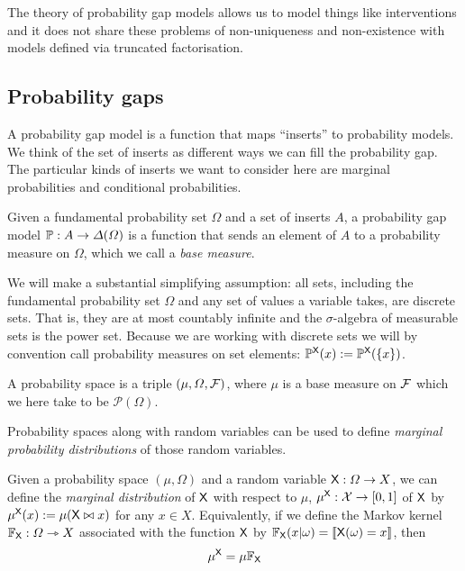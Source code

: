 The theory of probability gap models allows us to model things like interventions and it does not share these problems of non-uniqueness and non-existence with models defined via truncated factorisation.

\subsection{Probability gaps}

A probability gap model is a function that maps ``inserts'' to probability models. We think of the set of inserts as different ways we can fill the probability gap. The particular kinds of inserts we want to consider here are marginal probabilities and conditional probabilities.

\begin{definition}
Given a fundamental probability set $\Omega$ and a set of inserts $A$, a probability gap model $\mathbb{P}:A\to \Delta(\Omega)$ is a function that sends an element of $A$ to a probability measure on $\Omega$, which we call a \emph{base measure}.
\end{definition}

We will make a substantial simplifying assumption: all sets, including the fundamental probability set $\Omega$ and any set of values a variable takes, are discrete sets. That is, they are at most countably infinite and the $\sigma$-algebra of measurable sets is the power set. Because we are working with discrete sets we will by convention call probability measures on set elements: $\mathbb{P}^{\mathsf{X}}(x):=\mathbb{P}^{\mathsf{X}}(\{x\})$.

\begin{definition}
A probability space is a triple $(\mu,\Omega,\mathcal{F})$, where $\mu$ is a base measure on $\mathcal{F}$ which we here take to be $\mathscr{P}(\Omega)$.
\end{definition}

Probability spaces along with random variables can be used to define \emph{marginal probability distributions} of those random variables.

\begin{definition}\label{def:pushforward}
Given a probability space $(\mu,\Omega)$ and a random variable $\mathsf{X}:\Omega\to X$, we can define the \emph{marginal distribution} of $\mathsf{X}$ with respect to $\mu$, $\mu^{\mathsf{X}}:\mathcal{X}\to [0,1]$ of $\mathsf{X}$ by $\mu^{\mathsf{X}}(x):=\mu(\mathsf{X}\bowtie x)$ for any $x\in X$. Equivalently, if we define the Markov kernel $\mathbb{F}_{\mathsf{X}}:\Omega\rightarrowtriangle X$ associated with the function $\mathsf{X}$ by $\mathbb{F}_{\mathsf{X}}(x|\omega)=\llbracket \mathsf{X}(\omega)=x\rrbracket$, then
\begin{align}
	\mu^{\mathsf{X}} = \mu\mathbb{F}_{\mathsf{X}}
\end{align}
\end{definition}


